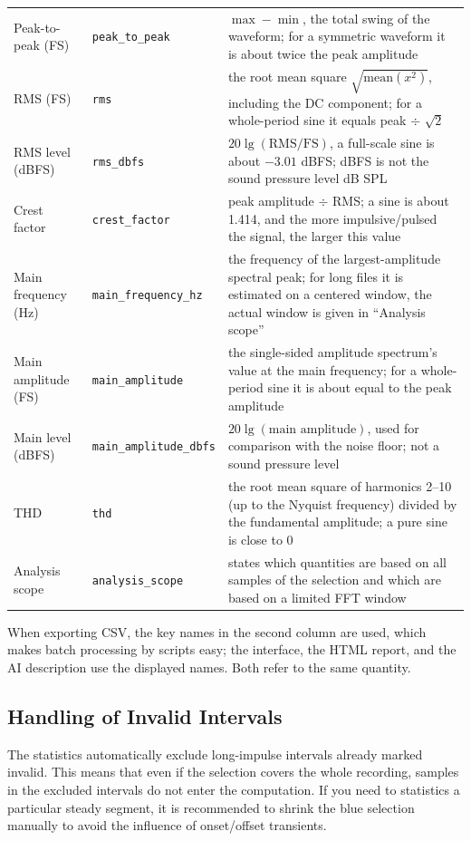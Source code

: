 \documentclass[UTF8,a4paper,12pt]{ctexart}
\begin{document}
{\begin{longtable}{@{}p{}p{}p{}@{}}
Peak-to-peak (FS) & \texttt{peak\_to\_peak} & $\max-\min$, the total swing of the waveform; for a symmetric waveform it is about twice the peak amplitude \\
RMS (FS) & \texttt{rms} & the root mean square $\sqrt{\mathrm{mean}(x^2)}$, including the DC component; for a whole-period sine it equals peak $\div$ $\sqrt{2}$ \\
RMS level (dBFS) & \texttt{rms\_dbfs} & $20\lg(\mathrm{RMS}/\mathrm{FS})$, a full-scale sine is about $-3.01$ dBFS; dBFS is not the sound pressure level dB SPL \\
Crest factor & \texttt{crest\_factor} & peak amplitude $\div$ RMS; a sine is about 1.414, and the more impulsive/pulsed the signal, the larger this value \\
Main frequency (Hz) & \texttt{main\_frequency\_hz} & the frequency of the largest-amplitude spectral peak; for long files it is estimated on a centered window, the actual window is given in ``Analysis scope'' \\
Main amplitude (FS) & \texttt{main\_amplitude} & the single-sided amplitude spectrum's value at the main frequency; for a whole-period sine it is about equal to the peak amplitude \\
Main level (dBFS) & \texttt{main\_amplitude\_dbfs} & $20\lg(\text{main amplitude})$, used for comparison with the noise floor; not a sound pressure level \\
THD & \texttt{thd} & the root mean square of harmonics 2--10 (up to the Nyquist frequency) divided by the fundamental amplitude; a pure sine is close to 0 \\
Analysis scope & \texttt{analysis\_scope} & states which quantities are based on all samples of the selection and which are based on a limited FFT window \\
\end{longtable}
}

When exporting CSV, the key names in the second column are used, which makes batch processing by scripts easy; the interface, the HTML report, and the AI description use the displayed names. Both refer to the same quantity.

\subsection{Handling of Invalid Intervals}

The statistics automatically exclude long-impulse intervals already marked invalid. This means that even if the selection covers the whole recording, samples in the excluded intervals do not enter the computation. If you need to statistics a particular steady segment, it is recommended to shrink the blue selection manually to avoid the influence of onset/offset transients.
\end{document}
